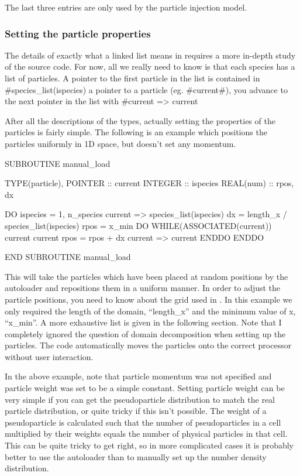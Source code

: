 The last three entries are only used by the particle injection model.

\subsubsection{Setting the particle properties}
The details of exactly what a linked list means in {\EPOCH} requires
a more in-depth study of the source code.
For now, all we really need to know is that each
species has a list of particles. A pointer to the first particle in the list
is contained in #species_list(ispecies)%
a pointer to a particle (eg. #current#), you advance to the next pointer in
the list with #current => current%

After all the descriptions of the types, actually setting the properties of
the particles is fairly simple. The following is an example which positions
the particles uniformly in 1D space, but doesn't set any momentum.
\begin{boxverbatim}
  SUBROUTINE manual_load

    TYPE(particle), POINTER :: current
    INTEGER :: ispecies
    REAL(num) :: rpos, dx

    DO ispecies = 1, n_species
      current => species_list(ispecies)%
      dx = length_x / species_list(ispecies)%
      rpos = x_min
      DO WHILE(ASSOCIATED(current))
        current%
        current%
        rpos = rpos + dx
        current => current%
      ENDDO
    ENDDO

  END SUBROUTINE manual_load
\end{boxverbatim}

This will take the particles which have been placed at random positions
by the autoloader and repositions them in a uniform manner. In order to
adjust the particle positions, you need to know about the grid used in
{\EPOCH}. In this example we only required the length of the domain,
``length\_x'' and the minimum value of x, ``x\_min''. A more exhaustive
list is given in the following section. Note that
I completely ignored the question of domain decomposition when setting up the
particles. The code automatically moves the particles onto the correct
processor without user interaction.

In the above example, note that particle momentum was not specified and
particle weight was set to be a simple constant. Setting particle weight can
be very simple if you can get the pseudoparticle distribution to match the
real particle distribution, or quite tricky if this isn't possible. The
weight of a pseudoparticle is calculated such that the number of
pseudoparticles in a cell multiplied by their weights equals the number
of physical particles in that cell.
This can be quite tricky to get right, so in more complicated
cases it is probably better to use the autoloader than to manually set up the
number density distribution.

